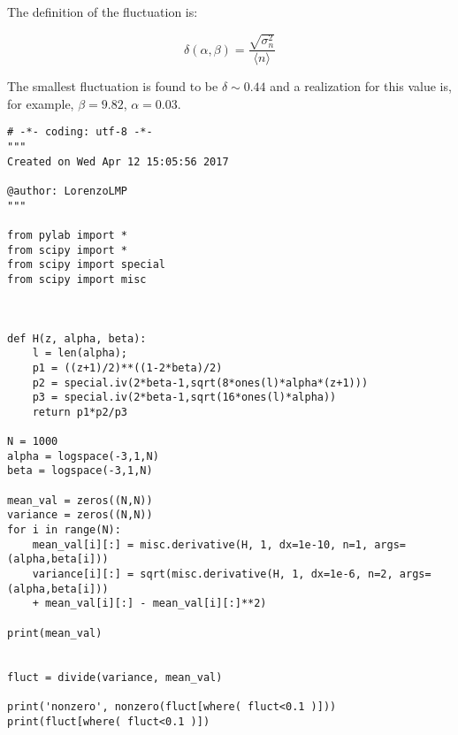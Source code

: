 \documentclass[11pt,letterpaper]{article}
\begin{document}
The definition of the fluctuation is:

\begin{equation}
\delta(\alpha, \beta) = \frac{\sqrt{\sigma_n^2}}{\langle n \rangle}
\end{equation}

The smallest fluctuation is found to be $\delta \sim 0.44$ and a realization for this value is, for example, $\beta = 9.82$, $\alpha = 0.03$.

\begin{lstlisting}
# -*- coding: utf-8 -*-
"""
Created on Wed Apr 12 15:05:56 2017

@author: LorenzoLMP
"""

from pylab import *  
from scipy import * 
from scipy import special
from scipy import misc



def H(z, alpha, beta):
    l = len(alpha);
    p1 = ((z+1)/2)**((1-2*beta)/2)
    p2 = special.iv(2*beta-1,sqrt(8*ones(l)*alpha*(z+1)))
    p3 = special.iv(2*beta-1,sqrt(16*ones(l)*alpha))
    return p1*p2/p3

N = 1000
alpha = logspace(-3,1,N)
beta = logspace(-3,1,N)    
    
mean_val = zeros((N,N))
variance = zeros((N,N))
for i in range(N):
    mean_val[i][:] = misc.derivative(H, 1, dx=1e-10, n=1, args=(alpha,beta[i]))
    variance[i][:] = sqrt(misc.derivative(H, 1, dx=1e-6, n=2, args=(alpha,beta[i])) 
    + mean_val[i][:] - mean_val[i][:]**2)

print(mean_val)


fluct = divide(variance, mean_val)

print('nonzero', nonzero(fluct[where( fluct<0.1 )]))
print(fluct[where( fluct<0.1 )])

\end{lstlisting}
\end{document}
